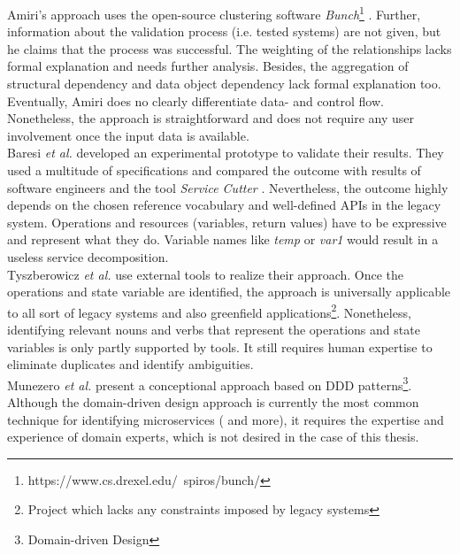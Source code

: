 \noindent
Amiri's approach \cite{ObjectAwareAmiri} uses the open-source clustering software \textit{Bunch}\footnote{https://www.cs.drexel.edu/~spiros/bunch/} . Further, information about the validation process (i.e. tested systems) are not given, but he claims that the process was successful. The weighting of the relationships lacks formal explanation and needs further analysis. Besides, the aggregation of structural dependency and data object dependency lack formal explanation too. 
Eventually, Amiri does no clearly differentiate data- and control flow.
Nonetheless, the approach is straightforward and does not require any user involvement once the input data is available. \\

\noindent
Baresi \textit{et al.} \cite{interfaceAnalysisBaresi} developed an experimental prototype to validate their results. They used a multitude of specifications and compared the outcome  with results of software engineers and the tool \textit{Service Cutter} \cite{ServiceCutter}. Nevertheless, the outcome highly depends on the chosen reference vocabulary and  well-defined APIs in the legacy system. Operations and resources (variables, return values) have to be expressive and represent what they do. Variable names like \textit{temp} or \textit{var1} would result in a useless service decomposition. \\

\noindent
Tyszberowicz \textit{et al.} \cite{FunctionalDecompositionHeinrich} use external tools to realize their approach. Once the operations and state variable are identified, the approach is universally applicable to all sort of legacy systems and also greenfield applications\footnote{Project which lacks any constraints imposed by legacy systems}. Nonetheless, identifying relevant nouns and verbs that represent the operations and state variables is only partly supported by tools. It still requires human expertise to eliminate duplicates and identify ambiguities. \\

\noindent
Munezero \textit{et al.} present a conceptional approach based on DDD patterns\footnote{Domain-driven Design}. Although the domain-driven design approach is currently the most common technique for identifying microservices (\cite{FunctionalDecompositionHeinrich}\cite{Fowler}\cite{MigratingTowardsSurvey} and more), it requires the expertise and experience of domain experts, which is not desired in the case of this thesis.\\

